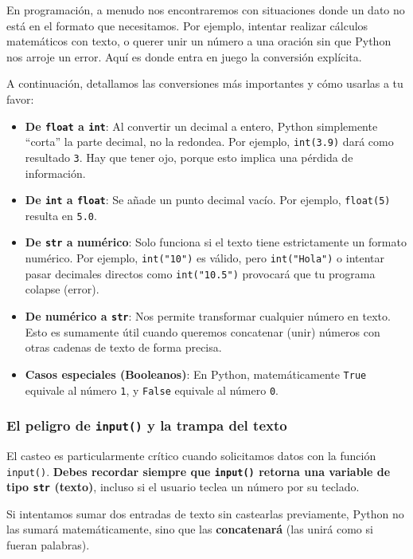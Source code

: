 \documentclass[11pt, a4paper]{article}
\begin{document}
	En programación, a menudo nos encontraremos con situaciones donde un dato no está en el formato que necesitamos. Por ejemplo, intentar realizar cálculos matemáticos con texto, o querer unir un número a una oración sin que Python nos arroje un error. Aquí es donde entra en juego la conversión explícita.
	
	A continuación, detallamos las conversiones más importantes y cómo usarlas a tu favor:
	\begin{itemize}
		\item \textbf{De \texttt{float} a \texttt{int}}: Al convertir un decimal a entero, Python simplemente ``corta'' la parte decimal, no la redondea. Por ejemplo, \texttt{int(3.9)} dará como resultado \texttt{3}. Hay que tener ojo, porque esto implica una pérdida de información.
		
		\item \textbf{De \texttt{int} a \texttt{float}}: Se añade un punto decimal vacío. Por ejemplo, \texttt{float(5)} resulta en \texttt{5.0}.
		
		\item \textbf{De \texttt{str} a numérico}: Solo funciona si el texto tiene estrictamente un formato numérico. Por ejemplo, \texttt{int("10")} es válido, pero \texttt{int("Hola")} o intentar pasar decimales directos como \texttt{int("10.5")} provocará que tu programa colapse (error).
		
		\item \textbf{De numérico a \texttt{str}}: Nos permite transformar cualquier número en texto. Esto es sumamente útil cuando queremos concatenar (unir) números con otras cadenas de texto de forma precisa.
		
		\item \textbf{Casos especiales (Booleanos)}: En Python, matemáticamente \texttt{True} equivale al número \texttt{1}, y \texttt{False} equivale al número \texttt{0}.
	\end{itemize}
	
	\subsubsection*{El peligro de \texttt{input()} y la trampa del texto}
	El casteo es particularmente crítico cuando solicitamos datos con la función \texttt{input()}. \textbf{Debes recordar siempre que \texttt{input()} retorna una variable de tipo \texttt{str} (texto)}, incluso si el usuario teclea un número por su teclado.
	
	Si intentamos sumar dos entradas de texto sin castearlas previamente, Python no las sumará matemáticamente, sino que las \textbf{concatenará} (las unirá como si fueran palabras). \\
	
\end{document}
